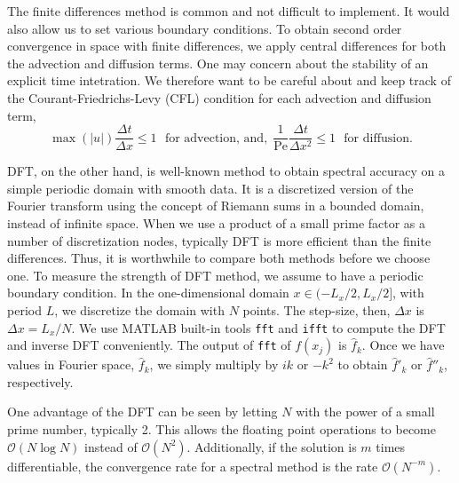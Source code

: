 The finite differences method is common and not difficult to implement. 
It would also allow us to set various boundary conditions. To obtain second order convergence in space with finite differences, we apply  central differences for both the advection and diffusion terms. 
One may concern about the stability of an explicit time intetration. We therefore want to be careful about and keep track of the Courant-Friedrichs-Levy (CFL) condition for each advection and diffusion term,
\begin{equation}
	\max(|u|) \frac{\Delta t}{\Delta x}  \leq 1 \ \ \ \text{for advection, and,}
	\ \  \frac{1}{\text{Pe}}\frac{\Delta t}{\Delta x^2}  \leq 1 \ \ \ \text{for diffusion}.
	\end{equation}

DFT, on the other hand, is well-known method to obtain spectral accuracy on a simple periodic domain with smooth data. It is a discretized version of the Fourier transform using the concept of Riemann sums in a bounded domain, instead of infinite space. 
When we use a product of a small prime factor as a number of discretization nodes, typically DFT is more efficient than the finite differences. Thus, it is worthwhile to compare both methods before we choose one. 
To measure the strength of DFT method, we assume to have a periodic boundary condition. In the one-dimensional domain $x \in (-L_x/2, L_x/2]$, with period $L$, we discretize the domain with $N$ points. The step-size, then, $\Delta x$ is$ \Delta x = L_x/N$.
We use MATLAB built-in tools \verb+fft+ and \verb+ifft+ to compute the DFT and inverse DFT conveniently.
The output of \verb+fft+ of $f(x_j)$ is $\hat{f}_k$. Once we have values in Fourier space, $\hat{f}_k$, we simply multiply by $ik$ or $-k^2$ to obtain $\hat{f}'_k$ or $\hat{f}''_k$, respectively. 
\par
One advantage of the DFT can be seen by letting $N$ with the power of a small prime number, typically 2. This allows the floating point operations to become $\mathcal{O}(N \log N)$ instead of $\mathcal{O}(N^2)$. Additionally, if the solution is $m$ times differentiable, the convergence rate for a spectral method is the rate $\mathcal{O}(N^{-m})$. 
